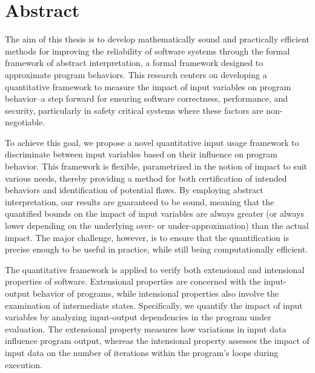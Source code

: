 
\chapter*{Abstract}


The aim of this thesis is to develop mathematically sound and practically efficient methods for improving the reliability of software systems through the formal framework of abstract interpretation, a formal framework designed to approximate program behaviors. This research centers on developing a quantitative framework to measure the impact of input variables on program behavior--a step forward for ensuring software correctness, performance, and security, particularly in safety critical systems where these factors are non-negotiable.


To achieve this goal, we propose a novel quantitative input usage framework to discriminate between input variables based on their influence on program behavior.
This framework is flexible, parametrized in the notion of impact to suit various needs, thereby providing a method for both certification of intended behaviors and identification of potential flaws.
By employing abstract interpretation, our results are guaranteed to be sound, meaning that the quantified bounds on the impact of input variables are always greater (or always lower depending on the underlying over- or under-approximation) than the actual impact.
The major challenge, however, is to ensure that the quantification is precise enough to be useful in practice, while still being computationally efficient.


The quantitative framework is applied to verify both extensional and intensional properties of software. Extensional properties are concerned with the input-output behavior of programs, while intensional properties also involve the examination of intermediate states. Specifically, we quantify the impact of input variables by analyzing input-output dependencies in the program under evaluation. The extensional property measures how variations in input data influence program output, whereas the intensional property assesses the impact of input data on the number of iterations within the program’s loops during execution.


